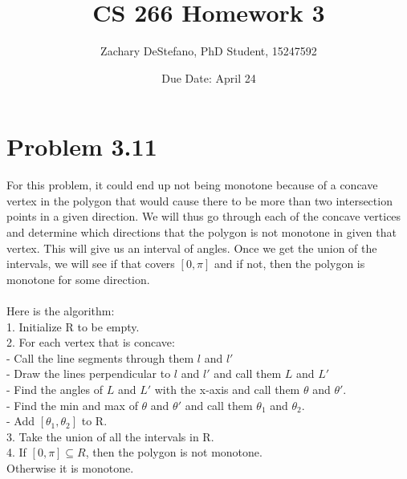 \documentclass[11pt,psfig]{article}
\begin{document}
\setlength{\parskip}{1.2ex plus0.3ex minus 0.3ex}


\thispagestyle{empty} \pagestyle{myheadings} 



\title{CS 266 Homework 3}
\author{Zachary DeStefano, PhD Student, 15247592}
\date{Due Date: April 24}

\maketitle

\vfill\eject

\section*{Problem 3.11}

For this problem, it could end up not being monotone because of a concave vertex in the polygon that would cause there to be more than two intersection points in a given direction. We will thus go through each of the concave vertices and determine which directions that the polygon is not monotone in given that vertex. This will give us an interval of angles. Once we get the union of the intervals, we will see if that covers $[0,\pi]$ and if not, then the polygon is monotone for some direction. \\
\\
Here is the algorithm:\\
1. Initialize R to be empty. \\
2. For each vertex that is concave:\\
- Call the line segments through them $l$ and $l'$ \\
- Draw the lines perpendicular to $l$ and $l'$ and call them $L$ and $L'$\\
- Find the angles of $L$ and $L'$ with the x-axis and call them $\theta$ and $\theta'$. \\
- Find the min and max of $\theta$ and $\theta'$ and call them $\theta_1$ and $\theta_2$. \\
- Add $[\theta_1,\theta_2]$ to R.\\
3. Take the union of all the intervals in R. \\
4. If $[0,\pi] \subseteq R$, then the polygon is not monotone. \\
Otherwise it is monotone. 
\end{document}
